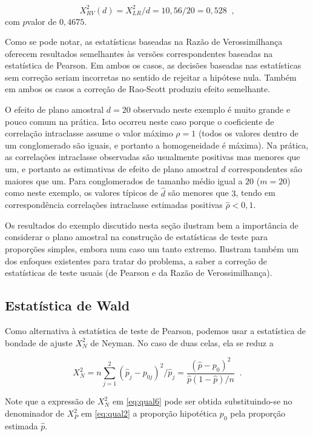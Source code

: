 \documentclass[]{book}
\numberwithin{example}{chapter}
\numberwithin{remark}{chapter}
\numberwithin{definition}{chapter}
\begin{document}
\[
X_{RV}^{2}(d)=X_{LR}^{2}/d=10,56/20=0,528\;\;, 
\] com \(p\)valor de \(0,4675\).

Como se pode notar, as estatísticas baseadas na Razão de Verossimilhança
oferecem resultados semelhantes às versões correspondentes baseadas na
estatística de Pearson. Em ambos os casos, as decisões baseadas nas
estatísticas sem correção seriam incorretas no sentido de rejeitar a
hipótese nula. Também em ambos os casos a correção de Rao-Scott produziu
efeito semelhante.

O efeito de plano amostral \(d=20\) observado neste exemplo é muito
grande e pouco comum na prática. Isto ocorreu neste caso porque o
coeficiente de correlação intraclasse assume o valor máximo \(\rho =1\)
(todos os valores dentro de um conglomerado são iguais, e portanto a
homogeneidade é máxima). Na prática, as correlações intraclasse
observadas são usualmente positivas mas menores que um, e portanto as
estimativas de efeito de plano amostral \(\widehat{d}\) correspondentes
são maiores que um. Para conglomerados de tamanho médio igual a \(20\)
(\(m=20\)) como neste exemplo, os valores típicos de \(\widehat{d}\) são
menores que \(3\), tendo em correspondência correlações intraclasse
estimadas positivas \(\widehat{\rho }<0,1\).

Os resultados do exemplo discutido nesta seção ilustram bem a
importância de considerar o plano amostral na construção de estatísticas
de teste para proporções simples, embora num caso um tanto extremo.
Ilustram também um dos enfoques existentes para tratar do problema, a
saber a correção de estatísticas de teste usuais (de Pearson e da Razão
de Verossimilhança).

\subsection{Estatística de Wald}\label{estatistica-de-wald}

Como alternativa à estatística de teste de Pearson, podemos usar a
estatística de bondade de ajuste \(X_{N}^{2}\) de Neyman. No caso de
duas celas, ela se reduz a

\begin{equation}
X_{N}^{2}=n\sum\limits_{j=1}^{2}\left( \hat{p}_{j}-p_{0j}\right) ^{2}/\hat{p}%
_{j}=\frac{\left( \widehat{p}-p_{0}\right) ^{2}}{\hat{p}\left( 1-\hat{p}
\right) /n}\;\;\mbox{.}  
\label{eq:qual6}
\end{equation}

Note que a expressão de \(X_{N}^{2}\) em \eqref{eq:qual6} pode ser obtida
substituindo-se no denominador de \(X_{P}^{2}\) em \eqref{eq:qual2} a
proporção hipotética \(p_{0}\) pela proporção estimada \(\hat{p}\).
\end{document}
